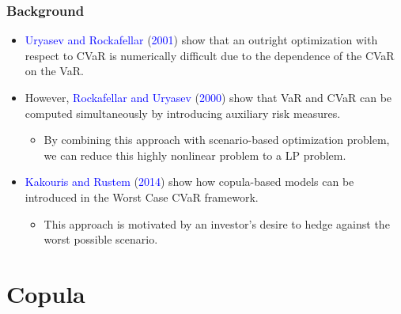 \documentclass[pdf,10pt,xcolor=dvipsnames,hide notes]{beamer}
\begin{document}
\begin{frame}[label=frame1b]
	\frametitle{Background}
	
	\begin{itemize}
		\setlength{\parskip}{15pt}
		\justifying
		
	\item<1> \textcolor{blue}{Uryasev and Rockafellar} (\textcolor{blue}{2001}) show that an outright optimization with respect to CVaR is numerically difficult due to the dependence of the CVaR on the VaR. 

	\item<1> However, \textcolor{blue}{Rockafellar and Uryasev} (\textcolor{blue}{2000}) show that VaR and CVaR can be computed simultaneously by introducing auxiliary risk measures. 
	\setlength{\parskip}{0pt}
	\begin{itemize}
		\item By combining this approach with scenario-based optimization problem, we can reduce this highly nonlinear problem to a LP problem. 
	\end{itemize}
	
\setlength{\parskip}{15pt}		
	\item<2> \textcolor{blue}{Kakouris and Rustem} (\textcolor{blue}{2014}) show how copula-based models can be introduced in the Worst Case CVaR framework. 
	\setlength{\parskip}{0pt}
	\begin{itemize}
		\item This approach is motivated by an investor's desire to hedge against the worst possible scenario.
	\end{itemize}
	
    \end{itemize}

\end{frame}

\section{Copula}
\end{document}
